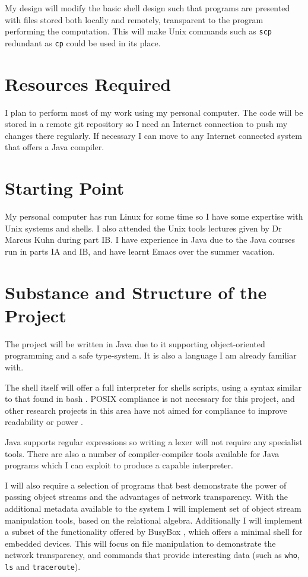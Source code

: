 \documentclass[12pt]{article}
\begin{document}
My design will modify the basic shell design such that programs are
presented with files stored both locally and remotely, transparent to
the program performing the computation. This will make Unix commands
such as \texttt{scp} redundant as \texttt{cp} could be used in its
place.

\section*{Resources Required}
I plan to perform most of my work using my personal computer. The code
will be stored in a remote git repository so I need an Internet
connection to push my changes there regularly. If necessary I can move
to any Internet connected system that offers a Java compiler.

\section*{Starting Point}
My personal computer has run Linux for some time so I have some
expertise with Unix systems and shells. I also attended the Unix tools
lectures given by Dr Marcus Kuhn during part IB. I have experience in
Java due to the Java courses run in parts IA and IB, and have learnt
Emacs over the summer vacation.

\section*{Substance and Structure of the Project}
The project will be written in Java due to it supporting
object-oriented programming and a safe type-system. It is also a
language I am already familiar with.

The shell itself will offer a full interpreter for shells scripts,
using a syntax similar to that found in bash \cite{bash}. POSIX
compliance \cite{posix} is not necessary for this project, and other
research projects in this area have not aimed for compliance to improve
readability \cite{fish} or power \cite{powershell}.

Java supports regular expressions so writing a lexer will not require
any specialist tools. There are also a number of compiler-compiler
tools available for Java programs which I can exploit to produce a
capable interpreter.

I will also require a selection of programs that best demonstrate the
power of passing object streams and the advantages of network
transparency. With the additional metadata available to the system I
will implement set of object stream manipulation tools, based on the
relational algebra. Additionally I will implement a subset of the
functionality offered by BusyBox \cite{busybox}, which offers a
minimal shell for embedded devices. This will focus on file
manipulation to demonstrate the network transparency, and commands
that provide interesting data (such as \texttt{who}, \texttt{ls} and
\texttt{traceroute}).
\end{document}
